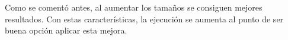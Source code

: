 
		
		Como se comentó antes, al aumentar los tamaños se consiguen mejores resultados. Con estas características, la ejecución se aumenta al punto de ser buena opción aplicar esta mejora.

